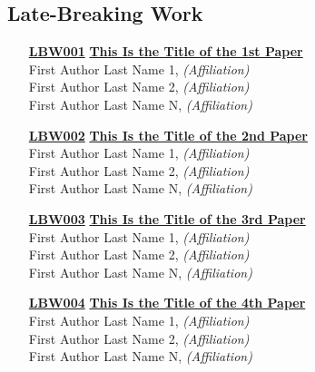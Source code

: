 \subsection{Late-Breaking Work}
\begin{enumerate}
\item[\href{https://doi.org/10.1145/1122445.1122456}{\textbf{LBW001}}]
\href{https://doi.org/10.1145/1122445.1122456}{\textbf{This Is the Title of the 1st Paper}}\\
First Author Last Name 1, \emph{(Affiliation)}\\
First Author Last Name 2, \emph{(Affiliation)}\\
First Author Last Name N, \emph{(Affiliation)}\\

\item[\href{https://doi.org/10.1145/1122445.1122456}{\textbf{LBW002}}]
\href{https://doi.org/10.1145/1122445.1122456}{\textbf{This Is the Title of the 2nd Paper}}\\
First Author Last Name 1, \emph{(Affiliation)}\\
First Author Last Name 2, \emph{(Affiliation)}\\
First Author Last Name N, \emph{(Affiliation)}\\

\item[\href{https://doi.org/10.1145/1122445.1122456}{\textbf{LBW003}}]
\href{https://doi.org/10.1145/1122445.1122456}{\textbf{This Is the Title of the 3rd Paper}}\\
First Author Last Name 1, \emph{(Affiliation)}\\
First Author Last Name 2, \emph{(Affiliation)}\\
First Author Last Name N, \emph{(Affiliation)}\\

\item[\href{https://doi.org/10.1145/1122445.1122456}{\textbf{LBW004}}]
\href{https://doi.org/10.1145/1122445.1122456}{\textbf{This Is the Title of the 4th Paper}}\\
First Author Last Name 1, \emph{(Affiliation)}\\
First Author Last Name 2, \emph{(Affiliation)}\\
First Author Last Name N, \emph{(Affiliation)}\\
\end{enumerate}



